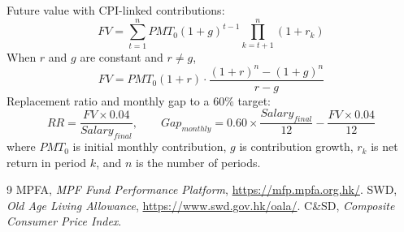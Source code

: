 \documentclass[12pt, letterpaper]{article}
\begin{document}
Future value with CPI-linked contributions:
\begin{equation}
  FV = \sum_{t=1}^{n} PMT_0 (1+g)^{t-1} \prod_{k=t+1}^{n}(1+r_k)
\end{equation}
When $r$ and $g$ are constant and $r \neq g$,
\begin{equation}
  FV = PMT_0 (1+r) \cdot \frac{(1+r)^n - (1+g)^n}{r - g}
\end{equation}
Replacement ratio and monthly gap to a 60\% target:
\begin{equation}
  RR = \frac{FV \times 0.04}{Salary_{final}}, \qquad
  Gap_{monthly} = 0.60 \times \frac{Salary_{final}}{12} - \frac{FV \times 0.04}{12}
\end{equation}
where $PMT_0$ is initial monthly contribution, $g$ is contribution growth, $r_k$ is net return in period $k$, and $n$ is the number of periods.

\begin{thebibliography}{9}
   MPFA, \textit{MPF Fund Performance Platform}, \url{https://mfp.mpfa.org.hk/}.
   SWD, \textit{Old Age Living Allowance}, \url{https://www.swd.gov.hk/oala/}.
   C\&SD, \textit{Composite Consumer Price Index}.
\end{thebibliography}
\end{document}
